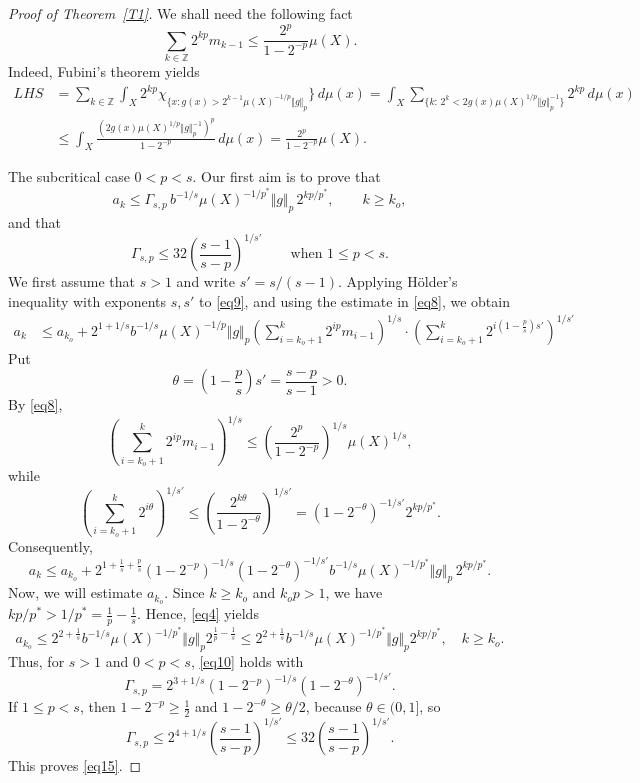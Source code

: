 \documentclass[12pt,leqno]{amsart}
\theoremstyle{definition}
\newcommand{\bbbz}{\mathbb Z}
\numberwithin{theorem}{section} \numberwithin{equation}{section}
\begin{document}
\begin{proof}[Proof of Theorem~\ref{T1}]
We shall need the following fact
\begin{equation}
\label{eq8}
\sum_{k\in\mathbb Z}
2^{kp}m_{k-1}
\leq \frac{2^p}{1-2^{-p}} \mu(X).
\end{equation}
Indeed, Fubini's theorem yields
\[
\begin{split}
LHS
&=
\sum_{k\in\bbbz}\int_X 2^{kp}\chi_{\{x:g(x)>2^{k-1}\mu(X)^{-1/p}\Vert g\Vert_p}\}\, d\mu(x)
=
\int_X\sum_{\{ k:\, 2^k<2g(x)\mu(X)^{1/p}\Vert g\Vert_p^{-1}\}}2^{kp}\, d\mu(x)\\
&\leq
\int_X\frac{(2g(x)\mu(X)^{1/p}\Vert g\Vert_p^{-1})^p}{1-2^{-p}}\, d\mu(x)=\frac{2^p}{1-2^{-p}}\mu(X).
\end{split}
\]

\noindent
{\sc The subcritical case $0<p<s$.}
Our first aim is to prove that
\begin{equation}
\label{eq10}
a_k\leq \Gamma_{s,p}\,b^{-1/s}\mu(X)^{-1/p^*}\Vert g\Vert_p\,2^{kp/p^*},
\qquad k\ge k_o,
\end{equation}
and that 
\begin{equation}
\label{eq15}
\Gamma_{s,p}\leq 32\left(\frac{s-1}{s-p}\right)^{1/s'}
\qquad
\text{when } 1\leq p<s.
\end{equation}
We first assume that $s>1$ and write $s'=s/(s-1)$. Applying H\"older's inequality with exponents $s,s'$ to \eqref{eq9}, and using the estimate in \eqref{eq8}, we obtain
\begin{align*}
a_k
&\leq a_{k_o}
 +2^{1+1/s}b^{-1/s}\mu(X)^{-1/p}\Vert g\Vert_p
 \left(
 \sum_{i=k_o+1}^k
 2^{ip}m_{i-1}
 \right)^{1/s}\cdot
 \left(
 \sum_{i=k_o+1}^k
2^{i(1-\frac{p}{s})s'}\right)^{1/s'}
\end{align*}
Put
\[
\theta=\left(1-\frac ps\right)s'
=\frac{s-p}{s-1}>0.
\]
By \eqref{eq8},
\[
\left(\sum_{i=k_o+1}^k2^{ip}m_{i-1}\right)^{1/s}
\leq
\left(\frac{2^p}{1-2^{-p}}\right)^{1/s}\mu(X)^{1/s},
\]
while
\[
\left(\sum_{i=k_o+1}^k2^{i\theta}\right)^{1/s'}
\leq
\left(\frac{2^{k\theta}}{1-2^{-\theta}}\right)^{1/s'}
=
(1-2^{-\theta})^{-1/s'}2^{kp/p^*}.
\]
Consequently,
\[
a_k\leq a_{k_o}
+2^{1+\frac{1}{s}+\frac{p}{s}}(1-2^{-p})^{-1/s}(1-2^{-\theta})^{-1/s'}
 b^{-1/s}\mu(X)^{-1/p^*}\Vert g\Vert_p\,2^{kp/p^*}.
\]
Now, we will estimate $a_{k_o}$. Since $k\geq k_o$ and $k_op>1$, we have $kp/p^*>1/p^*=\frac{1}{p}-\frac{1}{s}$. Hence, \eqref{eq4} yields
\[
a_{k_o}\leq 2^{2+\frac{1}{s}}b^{-1/s}\mu(X)^{-1/p^*}\Vert g\Vert_p 2^{\frac{1}{p}-\frac{1}{s}}\leq
2^{2+\frac{1}{s}} b^{-1/s}\mu(X)^{-1/p^*}\Vert g\Vert_p 2^{kp/p^*},
\quad
k\geq k_o.
\]
Thus, for $s>1$ and $0<p<s$, \eqref{eq10} holds with
\[
 \Gamma_{s,p}
 =2^{3+1/s}(1-2^{-p})^{-1/s}
 \left(1-2^{-\theta}\right)^{-1/s'}.
\]
If $1\leq p<s$, then $1-2^{-p}\ge\frac12$ and 
$1-2^{-\theta}\ge \theta/2$, because $\theta\in(0,1]$, so 
\[
\Gamma_{s,p}
\leq 2^{4+1/s}
\left(\frac{s-1}{s-p}\right)^{1/s'}
\leq 32\left(\frac{s-1}{s-p}\right)^{1/s'}.
\]
This proves \eqref{eq15}. 


\end{proof}
\end{document}
